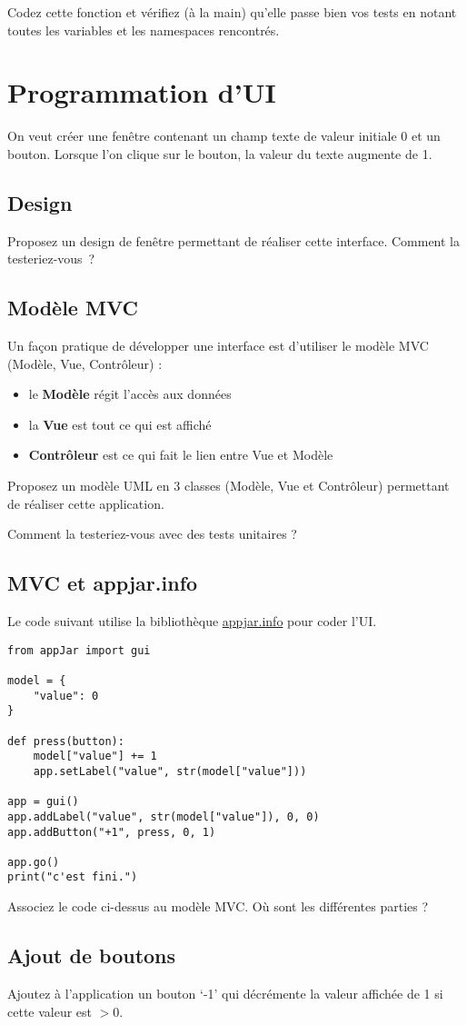 \documentclass[12pt]{article}
\begin{document}
Codez cette fonction et vérifiez (à la main) qu'elle passe bien vos tests en notant toutes les variables et les namespaces rencontrés.

\section{Programmation d'UI}

On veut créer une fenêtre contenant un champ texte de valeur initiale 0 et un bouton. Lorsque l'on clique sur le bouton, la valeur du texte augmente de 1.

\subsection{Design}

Proposez un design de fenêtre permettant de réaliser cette interface.
Comment la testeriez-vous~?

\subsection{Modèle MVC}

Un façon pratique de développer une interface est d'utiliser le modèle MVC (Modèle, Vue, Contrôleur) :
\begin{itemize}
	\item le {\bf Modèle} régit l'accès aux données
  \item la {\bf Vue} est tout ce qui est affiché
  \item {\bf Contrôleur} est ce qui fait le lien entre Vue et Modèle

\end{itemize}


Proposez un modèle UML en 3 classes (Modèle, Vue et Contrôleur) permettant de réaliser cette application.

Comment la testeriez-vous avec des tests unitaires ?

\subsection{MVC et appjar.info}

Le code suivant utilise la bibliothèque \url{appjar.info} pour coder l'UI.

\lstset{language=Python}
\begin{lstlisting}
from appJar import gui

model = {
    "value": 0
}

def press(button):
    model["value"] += 1
    app.setLabel("value", str(model["value"]))

app = gui()
app.addLabel("value", str(model["value"]), 0, 0)
app.addButton("+1", press, 0, 1)

app.go()
print("c'est fini.")
\end{lstlisting}

Associez le code ci-dessus au modèle MVC. Où sont les différentes parties ? 


\subsection{Ajout de boutons}

Ajoutez à  l'application un bouton `-1' qui décrémente la valeur affichée de 1 si cette valeur est $>0$.
\end{document}
